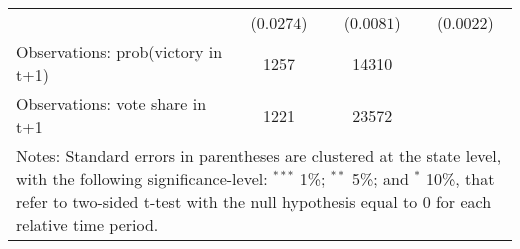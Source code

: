 \begin{table}[h]
{\begin{tabular}{lccc}
& ($ 0.0274$) & ($ 0.0081 $)  & ($ 0.0022 $)\\
\addlinespace
Observations: prob(victory in t+1)      &            1257        &     14310  \\
Observations: vote share in t+1      &            1221        &     23572  \\
\hline \hline
\multicolumn{4}{p{1\textwidth}}{\footnotesize{Notes: Standard errors in parentheses are clustered at the state level, with the following significance-level: $^{***}$ 1\%; $^{**}$ 5\%; and $^*$ 10\%, that refer to two-sided t-test with the null hypothesis equal to 0 for each relative time period.}}
\end{tabular}
}
\end{table}
